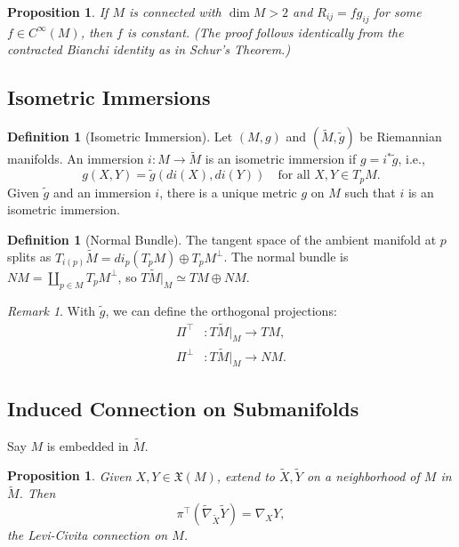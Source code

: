 \documentclass[11pt, a4paper]{article}
\theoremstyle{plain}
\newtheorem{proposition}[theorem]{Proposition}
\theoremstyle{definition}
\newtheorem{definition}[theorem]{Definition}
\theoremstyle{remark}
\newtheorem{remark}[theorem]{Remark}
\begin{document}
{\begin{proposition}
If $M$ is connected with $\dim M > 2$ and $R_{ij} = f g_{ij}$ for some $f \in C^\infty(M)$, then $f$ is constant. (The proof follows identically from the contracted Bianchi identity as in Schur's Theorem.)
\end{proposition}

\vspace{0.5cm}

\subsection{Isometric Immersions}

\begin{definition}[Isometric Immersion]
Let $(M, g)$ and $(\tilde{M}, \tilde{g})$ be Riemannian manifolds. An immersion $i: M \to \tilde{M}$ is an isometric immersion if $g = i^* \tilde{g}$, i.e.,
\[ g(X,Y) = \tilde{g}(di(X), di(Y)) \quad \text{for all } X,Y \in T_p M. \]
Given $\tilde{g}$ and an immersion $i$, there is a unique metric $g$ on $M$ such that $i$ is an isometric immersion.
\end{definition}

\begin{definition}[Normal Bundle]
The tangent space of the ambient manifold at $p$ splits as $T_{i(p)} \tilde{M} = di_p(T_p M) \oplus T_p M^\perp$. 
The normal bundle is $NM = \coprod_{p\in M} T_p M^\perp$, so $T \tilde{M}|_M \simeq TM \oplus NM$.
\end{definition}

\begin{remark}
With $\tilde{g}$, we can define the orthogonal projections:
\begin{align*}
\Pi^\top &: T \tilde{M}|_M \to TM, \\
\Pi^\perp &: T \tilde{M}|_M \to NM.
\end{align*}
\end{remark}

\newcommand{\II}{\mathrm{I\!I}}
\subsection{Induced Connection on Submanifolds}

Say $M$ is embedded in $\tilde{M}$.

\begin{proposition}
Given $X, Y \in \mathfrak{X}(M)$, extend to $\tilde{X}, \tilde{Y}$ on a neighborhood of $M$ in $\tilde{M}$. Then
\[
\pi^\top(\tilde{\nabla}_{\tilde{X}} \tilde{Y}) = \nabla_X Y,
\]
the Levi-Civita connection on $M$.
\end{proposition}

}
\end{document}
